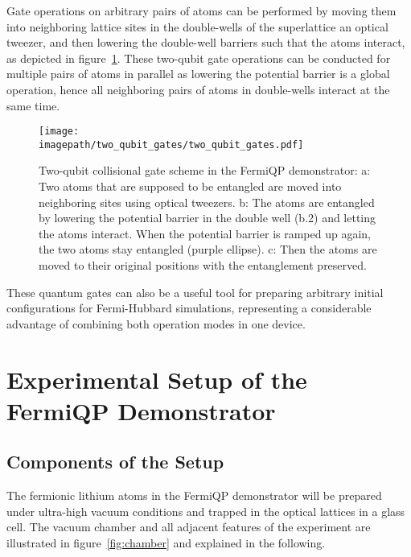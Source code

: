Gate operations on arbitrary pairs of atoms can be performed by moving them into neighboring lattice sites in the double-wells of the superlattice an optical tweezer, and then lowering the double-well barriers such that the atoms interact, as depicted in figure~\ref{fig:two_qubit_gates}. These two-qubit gate operations can be conducted for multiple pairs of atoms in parallel as lowering the potential barrier is a global operation, hence all neighboring pairs of atoms in double-wells interact at the same time.

\begin{figure}
    \centering
    \texttt{[image: \\imagepath/two\_qubit\_gates/two\_qubit\_gates.pdf]}
    \caption{Two-qubit collisional gate scheme in the FermiQP demonstrator: a: Two atoms that are supposed to be entangled are moved into neighboring sites using optical tweezers. b: The atoms are entangled by lowering the potential barrier in the double well (b.2) and letting the atoms interact. When the potential barrier is ramped up again, the two atoms stay entangled (purple ellipse). c: Then the atoms are moved to their original positions with the entanglement preserved.}
    \label{fig:two_qubit_gates}
\end{figure}

These quantum gates can also be a useful tool for preparing arbitrary initial configurations for Fermi-Hubbard simulations, representing a considerable advantage of combining both operation modes in one device.



\section{Experimental Setup of the FermiQP Demonstrator}

\subsection*{Components of the Setup}
The fermionic lithium atoms in the FermiQP demonstrator will be prepared under ultra-high vacuum conditions and trapped in the optical lattices in a glass cell. The vacuum chamber and all adjacent features of the experiment are illustrated in figure~\ref{fig:chamber} and explained in the following.

